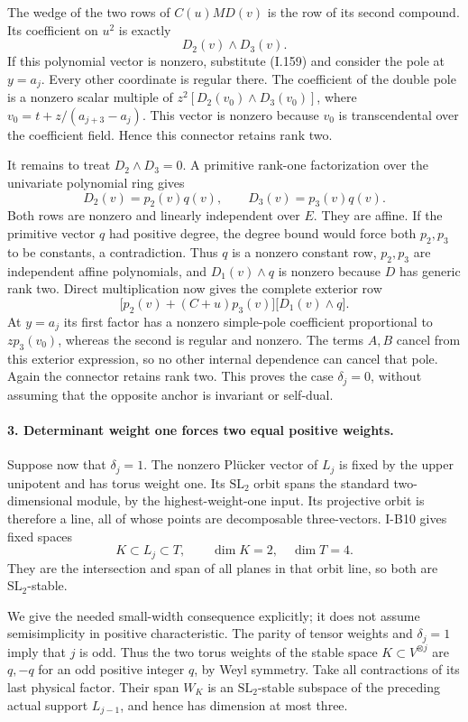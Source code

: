 The wedge of the two rows of $C(u)M D(v)$ is the row of its
second compound. Its coefficient on $u^2$ is exactly
\[
 D_2(v)\wedge D_3(v).
 \tag{I.163}
\]
If this polynomial vector is nonzero, substitute (I.159) and
consider the pole at $y=a_j$. Every other coordinate is
regular there. The coefficient of the double pole is a
nonzero scalar multiple of
$z^2[D_2(v_0)\wedge D_3(v_0)]$, where
$v_0=t+z/(a_{j+3}-a_j)$. This vector is nonzero because
$v_0$ is transcendental over the coefficient field. Hence
this connector retains rank two.

It remains to treat $D_2\wedge D_3=0$. A primitive rank-one
factorization over the univariate polynomial ring gives
\[
 D_2(v)=p_2(v)q(v),\qquad D_3(v)=p_3(v)q(v).
\]
Both rows are nonzero and linearly independent over $E$.
They are affine. If the primitive vector $q$ had positive
degree, the degree bound would force both $p_2,p_3$ to be
constants, a contradiction. Thus $q$ is a nonzero constant
row, $p_2,p_3$ are independent affine polynomials, and
$D_1(v)\wedge q$ is nonzero because $D$ has generic rank two.
Direct multiplication now gives the complete exterior row
\[
 \bigl[p_2(v)+(C+u)p_3(v)\bigr]
       \bigl[D_1(v)\wedge q\bigr].
 \tag{I.164}
\]
At $y=a_j$ its first factor has a nonzero simple-pole
coefficient proportional to $z p_3(v_0)$, whereas the second
is regular and nonzero. The terms $A,B$ cancel from this
exterior expression, so no other internal dependence can
cancel that pole. Again the connector retains rank two.
This proves the case $\delta_j=0$, without assuming that the
opposite anchor is invariant or self-dual.

\paragraph{3. Determinant weight one forces two equal positive weights.}
Suppose now that $\delta_j=1$. The nonzero Pl\"ucker vector
of $L_j$ is fixed by the upper unipotent and has torus weight
one. Its $\mathrm{SL}_2$ orbit spans the standard
two-dimensional module, by the highest-weight-one input.
Its projective orbit is therefore a line, all of whose
points are decomposable three-vectors. I-B10 gives fixed
spaces
\[
 K\subset L_j\subset T,\qquad \dim K=2,\quad \dim T=4.
 \tag{I.165}
\]
They are the intersection and span of all planes in that
orbit line, so both are $\mathrm{SL}_2$-stable.

We give the needed small-width consequence explicitly; it
does not assume semisimplicity in positive characteristic.
The parity of tensor weights and $\delta_j=1$ imply that
$j$ is odd. Thus the two torus weights of the stable space
$K\subset V^{\otimes j}$ are $q,-q$ for an odd positive
integer $q$, by Weyl symmetry. Take all contractions of its
last physical factor. Their span $W_K$ is an
$\mathrm{SL}_2$-stable subspace of the preceding actual
support $L_{j-1}$, and hence has dimension at most three.

